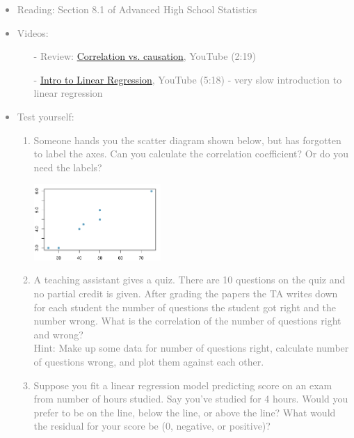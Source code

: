 \documentclass[11pt]{article}
\newcommand{\gray}[1]{\textcolor{gray}{#1}}
\begin{document}
\gray{
{\it
\vspace{-0.55cm}
\begin{itemize}
\renewcommand{\labelitemi}{{\textcolor{dark}{$\ast$}}}
\item Reading: Section 8.1 of Advanced High School Statistics
\item Videos: 
\begin{itemize}
\item[-] Review: \href{http://www.youtube.com/watch?v=5zyruPbgxyM}{Correlation vs. causation}, YouTube (2:19)
\item[-] \href{http://www.youtube.com/watch?v=zPG4NjIkCjc}{Intro to Linear Regression}, YouTube (5:18) - very slow introduction to linear regression
\end{itemize}
\item Test yourself:
\begin{enumerate}
\item Someone hands you the scatter diagram shown below, but has forgotten to label the axes. Can you calculate the correlation coefficient? Or do you need the labels?
\begin{center}
\includegraphics[width=0.4\textwidth]{figures/no_labels}
\end{center}
\item A teaching assistant gives a quiz. There are 10 questions on the quiz and no partial credit is given. After grading the papers the TA writes down for each student the number of questions the student got right and the number wrong. What is the correlation of the number of questions right and wrong? \\
Hint: Make up some data for number of questions right, calculate number of questions wrong, and plot them against each other.
\item Suppose you fit a linear regression model predicting score on an exam from number of hours studied. Say you've studied for 4 hours. Would you prefer to be on the line, below the line, or above the line? What would the residual for your score be (0, negative, or positive)?
\end{enumerate}
\end{itemize}
}}
\end{document}
